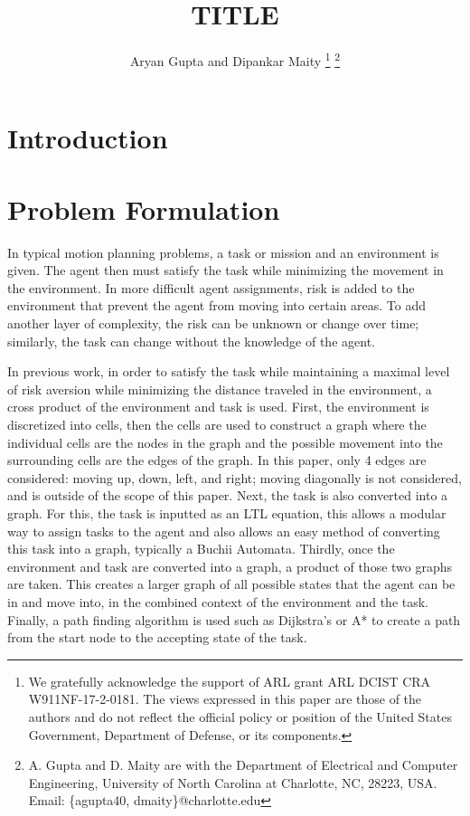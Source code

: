 \documentclass[letter paper, 10 pt, conference]{ieeeconf}
\title{\LARGE\bf TITLE }
\author{Aryan Gupta and Dipankar Maity
\thanks{
We gratefully acknowledge the support of ARL grant ARL DCIST CRA W911NF-17-2-0181. The views expressed in this paper are those of the authors and do not reflect the official policy or position of the United States Government, Department of Defense, or its components.
}
\thanks{A. Gupta and D. Maity are with the Department of Electrical and Computer Engineering, University of North Carolina at Charlotte,  NC, 28223, USA.
Email: 		{\{agupta40, dmaity\}@charlotte.edu}
}
}
\begin{document}
\maketitle


\begin{abstract}

\end{abstract}

\section{Introduction}


\section{Problem Formulation}
In typical motion planning problems, a task or mission and an environment is given. The agent then must satisfy the task while minimizing the movement in the environment. In more difficult agent assignments, risk is added to the environment that prevent the agent from moving into certain areas. To add another layer of complexity, the risk can be unknown or change over time; similarly, the task can change without the knowledge of the agent.

In previous work, in order to satisfy the task while maintaining a maximal level of risk aversion while minimizing the distance traveled in the environment, a cross product of the environment and task is used. First, the environment is discretized into cells, then the cells are used to construct a graph where the individual cells are the nodes in the graph and the possible movement into the surrounding cells are the edges of the graph. In this paper, only 4 edges are considered: moving up, down, left, and right; moving diagonally is not considered, and is outside of the scope of this paper. Next, the task is also converted into a graph. For this, the task is inputted as an LTL equation, this allows a modular way to assign tasks to the agent and also allows an easy method of converting this task into a graph, typically a Buchii Automata. Thirdly, once the environment and task are converted into a graph, a product of those two graphs are taken. This creates a larger graph of all possible states that the agent can be in and move into, in the combined context of the environment and the task. Finally, a path finding algorithm is used such as Dijkstra's or A* to create a path from the start node to the accepting state of the task.
\end{document}
